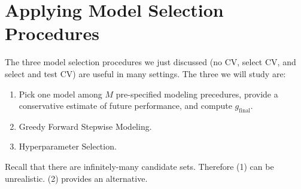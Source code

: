 \documentclass[12pt, a4paper]{article}
\theoremstyle{definition}
\begin{document}
	\section*{Applying Model Selection Procedures}
	The three model selection procedures we just discussed (no CV, select CV, and
	select and test CV) are useful in many settings. The three we will study are:
	\begin{enumerate}[label=(\arabic*)]
		\item Pick one model among $M$ pre-specified modeling precedures, provide
		a conservative estimate of future performance, and compute $g_{\text{final}}$.
		\item Greedy Forward Stepwise Modeling.
		\item Hyperparameter Selection.
	\end{enumerate}
	Recall that there are infinitely-many candidate sets. Therefore (1) can be unrealistic.
	(2) provides an alternative.
\end{document}
